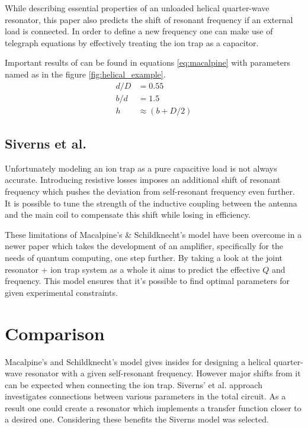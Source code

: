 While describing essential properties of an unloaded helical quarter-wave resonator, this paper \cite{Macalpine2000} also predicts the shift of resonant frequency if an external load is connected. In order to define a new frequency one can make use of telegraph equations \cite{Rohde2009} by effectively treating the ion trap as a capacitor.

Important results of \cite{Macalpine2000} can be found in equations \ref{eq:macalpine} with parameters named as in the figure \ref{fig:helical_example}.
\begin{equation}
\begin{aligned}
	d/D &= 0.55\\
	b/d &= 1.5\\
	h &\approx (b + D/2)
\end{aligned}
\label{eq:macalpine}
\end{equation}
\subsection{Siverns et al.}
Unfortunately modeling an ion trap as a pure capacitive load is not always accurate. Introducing resistive losses imposes an additional shift of resonant frequency which pushes the deviation from self-resonant frequency even further. It is possible to tune the strength of the inductive coupling between the antenna and the main coil to compensate this shift while losing in efficiency.

These limitations of Macalpine's \& Schildknecht's \cite{Macalpine2000} model have been overcome in a newer paper \cite{Siverns2012} which takes the development of an amplifier, specifically for the needs of quantum computing, one step further. By taking a look at the joint resonator + ion trap system as a whole it aims to predict the effective $Q$ and frequency. This model ensures that it's possible to find optimal parameters for given experimental constraints.

\section{Comparison}
Macalpine's and Schildknecht's \cite{Macalpine2000} model gives insides for designing a helical quarter-wave resonator with a given self-resonant frequency. However major shifts from it can be expected when connecting the ion trap. Siverns' et al. approach \cite{Siverns2012} investigates connections between various parameters in the total circuit. As a result one could create a resonator which implements a transfer function closer to a desired one. Considering these benefits the Siverns model \cite{Siverns2012} was selected.